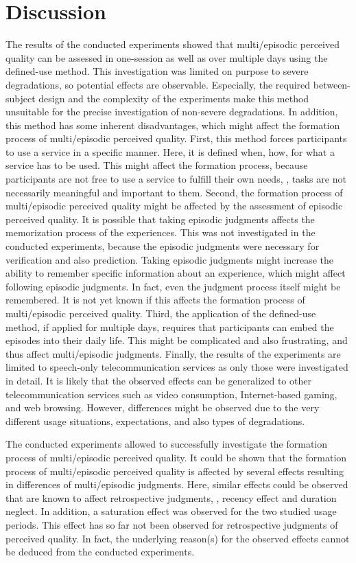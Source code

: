 \section{Discussion}
The results of the conducted experiments showed that multi\-/episodic perceived quality can be assessed in one-session as well as over multiple days using the defined-use method.
This investigation was limited on purpose to severe degradations, so potential effects are observable.
Especially, the required between-subject design and the complexity of the experiments make this method unsuitable for the precise investigation of non-severe degradations.
In addition, this method has some inherent disadvantages, which might affect the formation process of multi\-/episodic perceived quality.
First, this method forces participants to use a service in a specific manner.
Here, it is defined when, how, for what a service has to be used.
This might affect the formation process, because participants are not free to use a service to fulfill their own needs, \ie, tasks are not necessarily meaningful and important to them.
Second, the formation process of multi\-/episodic perceived quality might be affected by the assessment of episodic perceived quality.
It is possible that taking episodic judgments affects the memorization process of the experiences.
This was not investigated in the conducted experiments, because the episodic judgments were necessary for verification and also prediction.
Taking episodic judgments might increase the ability to remember specific information about an experience, which might affect following episodic judgments.
In fact, even the judgment process itself might be remembered.
It is not yet known if this affects the formation process of multi\-/episodic perceived quality.
Third, the application of the defined-use method, if applied for multiple days, requires that participants can embed the episodes into their daily life.
This might be complicated and also frustrating, and thus affect multi\-/episodic judgments.
Finally, the results of the experiments are limited to speech-only telecommunication services as only those were investigated in detail.
It is likely that the observed effects can be generalized to other telecommunication services such as video consumption, Internet-based gaming, and web browsing.
However, differences might be observed due to the very different usage situations, expectations, and also types of degradations.

The conducted experiments allowed to successfully investigate the formation process of multi\-/episodic perceived quality.
It could be shown that the formation process of multi\-/episodic perceived quality is affected by several effects resulting in differences of multi\-/episodic judgments.
Here, similar effects could be observed that are known to affect retrospective judgments, \ie, recency effect and duration neglect.
In addition, a saturation effect was observed for the two studied usage periods.
This effect has so far not been observed for retrospective judgments of perceived quality.
In fact, the underlying reason(s) for the observed effects cannot be deduced from the conducted experiments.

